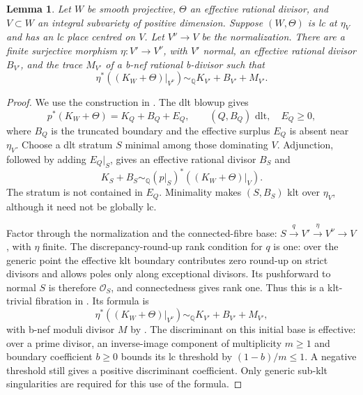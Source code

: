 \documentclass[12pt,a4paper,psamsfonts]{amsart}
\theoremstyle{definition}
\theoremstyle{plain}
\newtheorem{lemma}{Lemma}[section]
\newcommand{\Q}{\mathbb Q}
\newcommand{\OO}{\mathcal O}
\begin{document}
\begin{lemma}\label{lem:finite-subadjunction-model}
Let $W$ be smooth projective, $\Theta$ an effective rational divisor,
and $V\subset W$ an integral subvariety of positive dimension.
Suppose $(W,\Theta)$ is lc at $\eta_V$ and has an lc place centred on $V$.
Let $V^\nu\to V$ be the normalization. There are a finite surjective morphism
$\eta:V'\to V^\nu$, with $V'$ normal, an effective rational divisor
$B_{V'}$, and the trace $M_{V'}$ of a b-nef rational b-divisor such that
\[
 \eta^*((K_W+\Theta)|_{V^\nu})\sim_\Q K_{V'}+B_{V'}+M_{V'}.
\]
\end{lemma}
\begin{proof}
We use the construction in \cite[Lemma~7.1]{LA}.
The dlt blowup \cite[Theorem~2.10]{FH} gives
\[
 p^*(K_W+\Theta)=K_Q+B_Q+E_Q,
 \qquad (Q,B_Q)\text{ dlt},\quad E_Q\ge0,
\]
where $B_Q$ is the truncated boundary and the effective surplus
$E_Q$ is absent near $\eta_V$. Choose a dlt stratum $S$ minimal
among those dominating $V$. Adjunction, followed by adding
$E_Q|_S$, gives an effective rational divisor $B_S$ and
\[
 K_S+B_S\sim_\Q(p|_S)^*((K_W+\Theta)|_V).
\]
The stratum is not contained in $E_Q$. Minimality makes
$(S,B_S)$ klt over $\eta_V$, although it need not be globally lc.

Factor through the normalization and the connected-fibre base:
$S\xrightarrow{q}V'\xrightarrow{\eta}V^\nu\to V$, with $\eta$
finite. The discrepancy-round-up rank condition for $q$ is one:
over the generic point the effective klt boundary contributes
zero round-up on strict divisors and allows poles only along
exceptional divisors. Its pushforward to normal $S$ is therefore
$\OO_S$, and connectedness gives rank one. Thus this is a
klt-trivial fibration in \cite[Definition~3.1]{FG}. Its formula is
\[
 \eta^*((K_W+\Theta)|_{V^\nu})
 \sim_\Q K_{V'}+B_{V'}+M_{V'},
\]
with b-nef moduli divisor $M$ by \cite[Theorem~3.5]{FG}.
The discriminant on this initial base is effective: over a prime
divisor, an inverse-image component of multiplicity $m\ge1$ and
boundary coefficient $b\ge0$ bounds its lc threshold by
$(1-b)/m\le1$. A negative threshold still gives a positive
discriminant coefficient. Only generic sub-klt singularities are
required for this use of the formula.
\end{proof}
\end{document}
